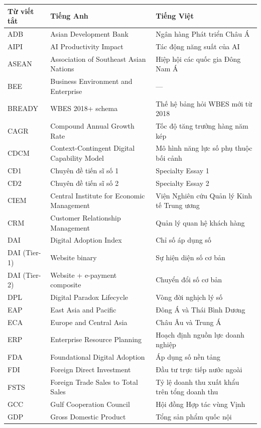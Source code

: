 \documentclass[12pt,a4paper]{article}
\begin{document}
\begin{longtable}[]{@{}lll@{}}
\toprule\noalign{}
Từ viết tắt & Tiếng Anh & Tiếng Việt \\
\midrule\noalign{}
\endhead
\bottomrule\noalign{}
\endlastfoot
ADB & Asian Development Bank & Ngân hàng Phát triển Châu Á \\
AIPI & AI Productivity Impact & Tác động năng suất của AI \\
ASEAN & Association of Southeast Asian Nations & Hiệp hội các quốc gia
Đông Nam Á \\
BEE & Business Environment and Enterprise & --- \\
BREADY & WBES 2018+ schema & Thế hệ bảng hỏi WBES mới từ 2018 \\
CAGR & Compound Annual Growth Rate & Tốc độ tăng trưởng hàng năm kép \\
CDCM & Context-Contingent Digital Capability Model & Mô hình năng lực số
phụ thuộc bối cảnh \\
CĐ1 & Chuyên đề tiến sĩ số 1 & Specialty Essay 1 \\
CĐ2 & Chuyên đề tiến sĩ số 2 & Specialty Essay 2 \\
CIEM & Central Institute for Economic Management & Viện Nghiên cứu Quản
lý Kinh tế Trung ương \\
CRM & Customer Relationship Management & Quản lý quan hệ khách hàng \\
DAI & Digital Adoption Index & Chỉ số áp dụng số \\
DAI (Tier-1) & Website binary & Sự hiện diện số cơ bản \\
DAI (Tier-2) & Website + e-payment composite & Chuyển đổi số cơ bản \\
DPL & Digital Paradox Lifecycle & Vòng đời nghịch lý số \\
EAP & East Asia and Pacific & Đông Á và Thái Bình Dương \\
ECA & Europe and Central Asia & Châu Âu và Trung Á \\
ERP & Enterprise Resource Planning & Hoạch định nguồn lực doanh
nghiệp \\
FDA & Foundational Digital Adoption & Áp dụng số nền tảng \\
FDI & Foreign Direct Investment & Đầu tư trực tiếp nước ngoài \\
FSTS & Foreign Trade Sales to Total Sales & Tỷ lệ doanh thu xuất khẩu
trên tổng doanh thu \\
GCC & Gulf Cooperation Council & Hội đồng Hợp tác vùng Vịnh \\
GDP & Gross Domestic Product & Tổng sản phẩm quốc nội \\

\end{longtable}
\end{document}
